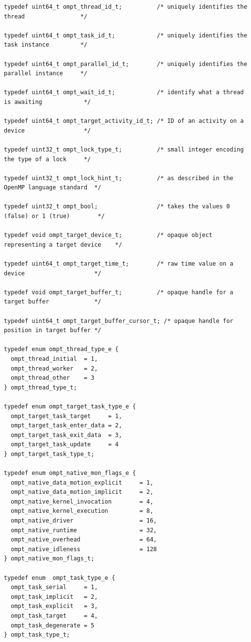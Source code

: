 \documentclass{article}
\begin{document}
{\begin{verbatim}
typedef uint64_t ompt_thread_id_t;          /* uniquely identifies the thread                */ 

typedef uint64_t ompt_task_id_t;            /* uniquely identifies the task instance         */

typedef uint64_t ompt_parallel_id_t;        /* uniquely identifies the parallel instance     */

typedef uint64_t ompt_wait_id_t;            /* identify what a thread is awaiting            */

typedef uint64_t ompt_target_activity_id_t; /* ID of an activity on a device                 */

typedef uint32_t ompt_lock_type_t;          /* small integer encoding the type of a lock     */

typedef uint32_t ompt_lock_hint_t;          /* as described in the OpenMP language standard  */

typedef uint32_t ompt_bool;                 /* takes the values 0 (false) or 1 (true)        */

typedef void ompt_target_device_t;          /* opaque object representing a target device    */

typedef uint64_t ompt_target_time_t;        /* raw time value on a device                    */

typedef void ompt_target_buffer_t;          /* opaque handle for a target buffer             */ 

typedef uint64_t ompt_target_buffer_cursor_t; /* opaque handle for position in target buffer */

typedef enum ompt_thread_type_e {
  ompt_thread_initial  = 1,
  ompt_thread_worker   = 2,
  ompt_thread_other    = 3
} ompt_thread_type_t;

typedef enum ompt_target_task_type_e {
  ompt_target_task_target     = 1,
  ompt_target_task_enter_data = 2,
  ompt_target_task_exit_data  = 3,
  ompt_target_task_update     = 4
} ompt_target_task_type_t;

typedef enum ompt_native_mon_flags_e {
  ompt_native_data_motion_explicit     = 1,
  ompt_native_data_motion_implicit     = 2,
  ompt_native_kernel_invocation        = 4,
  ompt_native_kernel_execution         = 8,
  ompt_native_driver                   = 16,
  ompt_native_runtime                  = 32,
  ompt_native_overhead                 = 64,
  ompt_native_idleness                 = 128
} ompt_native_mon_flags_t;

typedef enum  ompt_task_type_e {
  ompt_task_serial     = 1,
  ompt_task_implicit   = 2,
  ompt_task_explicit   = 3,
  ompt_task_target     = 4,
  ompt_task_degenerate = 5
} ompt_task_type_t;


\end{verbatim}}
\end{document}
